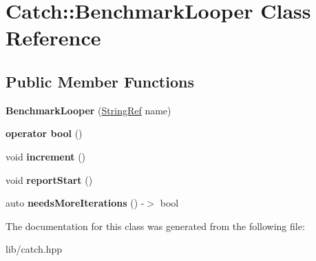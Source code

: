 \hypertarget{class_catch_1_1_benchmark_looper}{}\section{Catch\+:\+:Benchmark\+Looper Class Reference}
\label{class_catch_1_1_benchmark_looper}
\subsection*{Public Member Functions}
\begin{DoxyCompactItemize}
\item 
\mbox{\label{class_catch_1_1_benchmark_looper_ab9ba6397306a70082f39e63a8a71bde6}} 
{\bfseries Benchmark\+Looper} (\mbox{\hyperlink{class_catch_1_1_string_ref}{String\+Ref}} name)
\item 
\mbox{\label{class_catch_1_1_benchmark_looper_a54da41bada9da038dc05faf41d746765}} 
{\bfseries operator bool} ()
\item 
\mbox{\label{class_catch_1_1_benchmark_looper_a210552aff5b19408637444d4bb35d59c}} 
void {\bfseries increment} ()
\item 
\mbox{\label{class_catch_1_1_benchmark_looper_a0697d1b266112b110edf2025b82c4e77}} 
void {\bfseries report\+Start} ()
\item 
\mbox{\label{class_catch_1_1_benchmark_looper_a97bd944521f519b1593a5d1d2f9998fa}} 
auto {\bfseries needs\+More\+Iterations} () -\/$>$ bool
\end{DoxyCompactItemize}


The documentation for this class was generated from the following file\+:\begin{DoxyCompactItemize}
\item 
lib/catch.\+hpp\end{DoxyCompactItemize}
